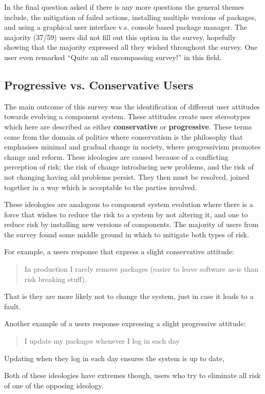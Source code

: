 In the final question asked if there is any more questions the general themes include, 
the mitigation of failed actions, installing multiple versions of packages, and using a graphical user interface v.s. console based package manager.
The majority (37/59) users did not fill out this option in the survey, hopefully showing that the majority expressed all they wished throughout the survey.
One user even remarked ``Quite an all encompassing survey!'' in this field.

\subsection{Progressive vs. Conservative Users}
The main outcome of this survey was the identification of different user attitudes towards evolving a component system.
These attitudes create user stereotypes which here are described as either \textbf{conservative} or \textbf{progressive}.
These terms come from the domain of politics where conservatism is the philosophy that emphasises minimal and gradual change in society,
where progressivism promotes change and reform.
These ideologies are caused because of a conflicting perception of risk; the risk of change introducing new problems, and the risk of not changing having old problems persist.
They then must be resolved, joined together in a way which is acceptable to the parties involved.

These ideologies are analogous to component system evolution where there is a force that wishes to reduce the risk to a system by not altering it,
and one to reduce risk by installing new versions of components.
The majority of users from the survey found some middle ground in which to mitigate both types of risk.

For example, a users response that express a slight conservative attitude:
\begin{quotation}
In production I rarely remove packages (easier to leave software as-is than risk breaking stuff).
\end{quotation}
That is they are more likely not to change the system, just in case it leads to a fault. 

Another example of a users response expressing a slight progressive attitude:
\begin{quotation}
I update my packages whenever I log in each day
\end{quotation}
Updating when they log in each day ensures the system is up to date, 

Both of these ideologies have extremes though, users who try to eliminate all risk of one of the opposing ideology.

